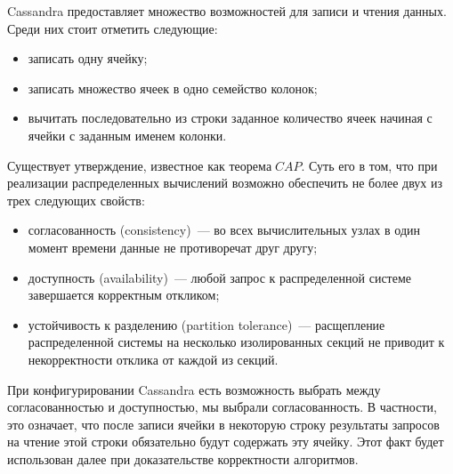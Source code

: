 Cassandra предоставляет множество возможностей для записи и чтения данных. Среди них стоит отметить следующие:

\begin{itemize}
	\item записать одну ячейку;
	\item записать множество ячеек в одно семейство колонок;
	\item вычитать последовательно из строки заданное количество ячеек начиная с ячейки с заданным именем колонки.
\end{itemize}

Существует утверждение, известное как $теорема\;CAP$. Суть его в том, что при реализации распределенных вычислений возможно обеспечить не более двух из трех следующих свойств:

\begin{itemize}
	\item согласованность (consistency)~--- во всех вычислительных узлах в один момент времени данные не противоречат друг другу;
	\item доступность (availability)~--- любой запрос к распределенной системе завершается корректным откликом;
	\item устойчивость к разделению (partition tolerance)~--- расщепление распределенной системы на несколько изолированных секций не приводит к некорректности отклика от каждой из секций.
\end{itemize}

При конфигурировании Cassandra есть возможность выбрать между согласованностью и доступностью, мы выбрали согласованность. В частности, это означает, что после записи ячейки в некоторую строку результаты запросов на чтение этой строки обязательно будут содержать эту ячейку. Этот факт будет использован далее при доказательстве корректности алгоритмов.
